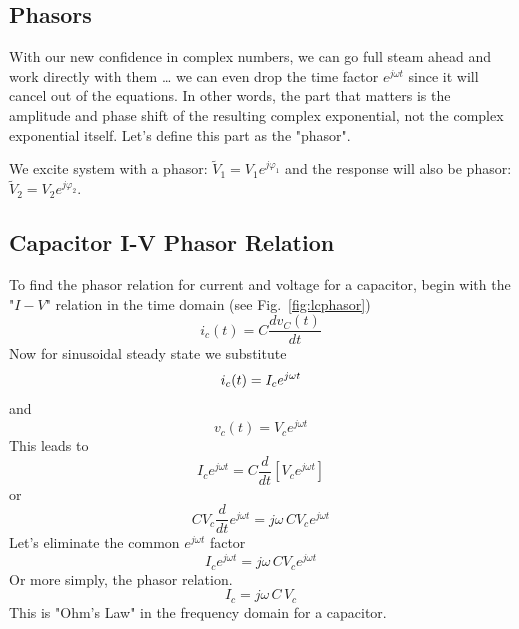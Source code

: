


\subsection{Phasors}



  
With our new confidence in complex numbers, we can go full steam ahead and work directly with them … we can even drop the time factor $e^{j\omega t}$ since it will cancel out of the equations.  In other words, the part that matters is the amplitude and phase shift of the resulting complex exponential, not the complex exponential itself.  Let's define this part as the "phasor".

We excite system with a phasor: ${\tilde V_1} = {V_1}{e^{j{\varphi _1}}}$ and the response  will also be phasor: ${\tilde V_2} = {V_2}{e^{j{\varphi _2}}}$.   
 
 


\subsection{Capacitor I-V Phasor Relation}

  
To find the phasor relation for current and voltage for a capacitor, begin with the "$I-V$" relation in the time domain (see Fig.~\ref{fig:lcphasor})
 \begin{equation}
{ i_c}(t) = C\frac{{d{v_C}(t)}}{{dt}}
 \end{equation}
Now for sinusoidal steady state we substitute
\begin{equation}
{i_c}(t) = {I_c}{e^{j\omega t}}\\
\end{equation}
and
\begin{equation}
{v_c}(t) = {V_c}{e^{j\omega t}}
\end{equation}
This leads to
\begin{equation}
{I_c}{e^{j\omega t}} = C\frac{d}{{dt}}[{V_c}{e^{j\omega t}}]
\end{equation}
or
\begin{equation}
C{V_c}\frac{d}{{dt}}{e^{j\omega t}} = j\omega \,C{V_c}{e^{j\omega t}}
\end{equation}
Let's eliminate the common $e^{j\omega t}$ factor
\begin{equation}
{I_c}{e^{j\omega t}} = j\omega \,C{V_c}{e^{j\omega t}}
\end{equation}
Or more simply, the phasor relation.  
\begin{equation}
{I_c} = j\omega \,C\,{V_c}
\end{equation}
This is "Ohm's Law" in the frequency domain for a capacitor.

